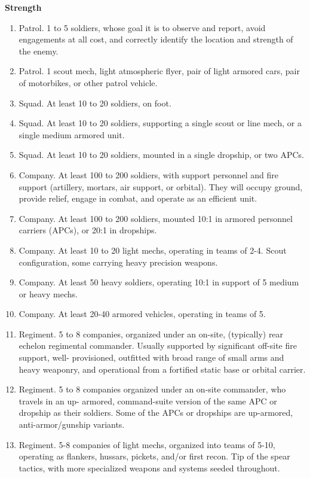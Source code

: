 \textbf{Strength}
\begin{enumerate}
    \item Patrol. 1 to 5 soldiers, whose goal it is to observe and report, avoid engagements at all cost, and correctly identify the location and strength of the enemy.
    \item Patrol. 1 scout mech, light atmospheric flyer, pair of light armored cars, pair of motorbikes, or other patrol vehicle.
    \item Squad. At least 10 to 20 soldiers, on foot.
    \item Squad. At least 10 to 20 soldiers, supporting a single scout or line mech, or a single medium armored unit.
    \item Squad. At least 10 to 20 soldiers, mounted in a single dropship, or two APCs.
    \item Company. At least 100 to 200 soldiers, with support personnel and fire support (artillery, mortars, air support, or orbital). They will occupy ground, provide relief, engage in combat, and operate as an efficient unit.
    \item Company. At least 100 to 200 soldiers, mounted 10:1 in armored personnel carriers (APCs), or 20:1 in dropships.
    \item Company. At least 10 to 20 light mechs, operating in teams of 2-4. Scout configuration, some carrying heavy precision weapons.
    \item Company. At least 50 heavy soldiers, operating 10:1 in support of 5 medium or heavy mechs.
    \item Company. At least 20-40 armored vehicles, operating in teams of 5.
    \item Regiment. 5 to 8 companies, organized under an on-site, (typically) rear echelon regimental commander. Usually supported by significant off-site fire support, well- provisioned, outfitted with broad range of small arms and heavy weaponry, and operational from a fortified static base or orbital carrier.
    \item Regiment. 5 to 8 companies organized under an on-site commander, who travels in an up- armored, command-suite version of the same APC or dropship as their soldiers. Some of the APCs or dropships are up-armored, anti-armor/gunship variants.
    \item Regiment. 5-8 companies of light mechs, organized into teams of 5-10, operating as flankers, hussars, pickets, and/or first recon. Tip of the spear tactics, with more specialized weapons and systems seeded throughout.

\end{enumerate}

